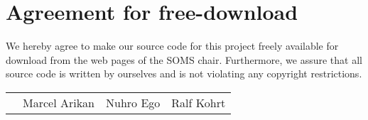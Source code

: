 \section*{Agreement for free-download}
\bigskip


\bigskip


\large We hereby agree to make our source code for this project freely available for download from the web pages of the SOMS chair. Furthermore, we assure that all source code is written by ourselves and is not violating any copyright restrictions.

\begin{center}

\bigskip


\bigskip


\begin{tabular}{@{}p{3cm}@{}p{4cm}@{}@{}p{4cm}@{}@{}p{4cm}@{}}
\begin{minipage}{2cm}

\end{minipage}
&
\begin{minipage}{4cm}
\vspace{2mm} \large Marcel Arikan

 \vspace{\baselineskip}

\end{minipage}
&
\begin{minipage}{4cm}
\vspace{2mm} \large Nuhro Ego

 \vspace{\baselineskip}

\end{minipage}
&
\begin{minipage}{4cm}

\large Ralf Kohrt

\end{minipage}
\end{tabular}


\end{center}
\newpage





